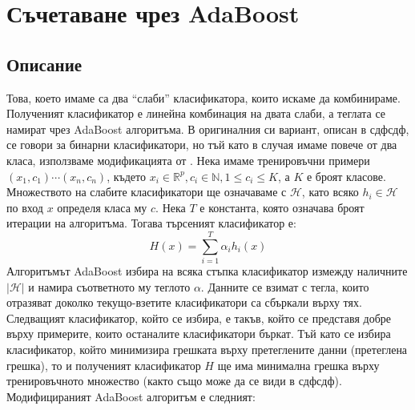 \documentclass[main.tex]{subfiles}
\begin{document}
\section{Съчетаване чрез AdaBoost}
\subsection{Описание}
Това, което имаме са два ``слаби'' класификатора, които искаме да комбинираме. Полученият класификатор е линейна комбинация на двата слаби, а теглата се намират чрез AdaBoost алгоритъма. В оригиналния си вариант, описан в сдфсдф, се говори за бинарни класификатори, но тъй като в случая имаме повече от два класа, използваме модификацията от \cite{samme}. Нека имаме тренировъчни примери $(x_1, c_1)\cdots (x_n, c_n)$, където $x_i \in \mathbb{R}^p, c_i \in \mathbb{N}, 1\leq c_i \leq K$, а $K$ е броят класове. Множеството на слабите класификатори ще означаваме с $\mathcal{H}$, като всяко $h_i \in \mathcal{H}$ по вход $x$ определя класа му $c$. Нека $T$ е константа, която означава броят итерации на алгоритъма. Тогава търсеният класификатор е: \[H(x) = \sum\limits_{i=1}^{T} \alpha_i h_i(x)\]
Алгоритъмът AdaBoost избира на всяка стъпка класификатор измежду наличните $|\mathcal{H}|$ и намира съответното му теглото $\alpha$. Данните се взимат с тегла, които отразяват доколко текущо-взетите класификатори са сбъркали върху тях. Следващият класификатор, който се избира, е такъв, който се представя добре върху примерите, които останалите класификатори бъркат. Тъй като се избира класификатор, който минимизира грешката върху претеглените данни (претеглена грешка), то и полученият класификатор $H$ ще има минимална грешка върху тренировъчното множество (както също може да се види в сдфсдф). Модифицираният AdaBoost алгоритъм е следният:
\end{document}
